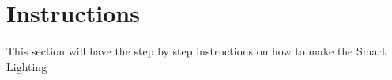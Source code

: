 \section{Instructions}
This section will have the step by step instructions on how to make the Smart Lighting
